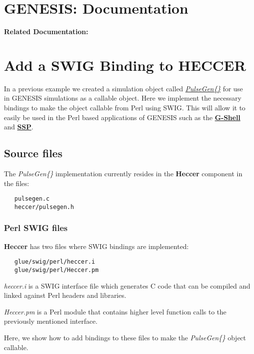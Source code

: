 \documentclass[12pt]{article}
\begin{document}
\section*{GENESIS: Documentation}

{\bf Related Documentation:}

\section*{Add a SWIG Binding to HECCER}

In a previous example we created a simulation object called \href{../genesis-add-object-solver/genesis-add-object-solver.tex}{\it PulseGen\{\}} for use in GENESIS simulations as a callable object. Here we implement the necessary bindings to make the object callable from Perl using SWIG. This will allow it to easily be used in the Perl based applications of GENESIS such as the \href{../gshell/gshell.tex}{\bf G-Shell} and \href{../ssp/ssp.tex}{\bf SSP}.

\subsection*{Source files}

The {\it PulseGen\{\}} implementation currently resides in the {\bf Heccer} component in the files:
\begin{verbatim}
   pulsegen.c
   heccer/pulsegen.h
\end{verbatim}

\subsubsection*{Perl SWIG files}

{\bf Heccer} has two files where SWIG bindings are implemented:

\begin{verbatim}
   glue/swig/perl/heccer.i
   glue/swig/perl/Heccer.pm
\end{verbatim}

{\it heccer.i} is a SWIG interface file which generates C code that can be compiled and linked against Perl headers and libraries.

{\it Heccer.pm} is a Perl module that contains higher level function calls to the previously mentioned interface.

Here, we show how to add bindings to these files to make the {\it PulseGen\{\}} object callable.
\end{document}
